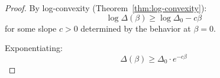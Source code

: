 \begin{proof}
By log-convexity (Theorem~\ref{thm:log-convexity}):
\[
\log \Delta(\beta) \geq \log \Delta_0 - c \beta
\]
for some slope $c > 0$ determined by the behavior at $\beta = 0$.

Exponentiating:
\[
\Delta(\beta) \geq \Delta_0 \cdot e^{-c\beta}
\]
\end{proof}






